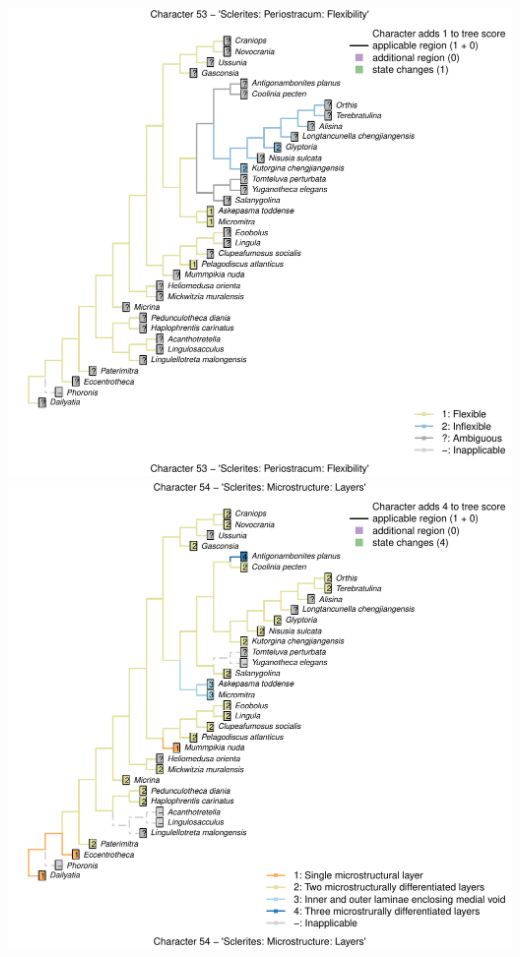 \documentclass[]{book}
\theoremstyle{definition}
\theoremstyle{definition}
\theoremstyle{definition}
\theoremstyle{remark}
\begin{document}
\includegraphics{Brachiopod_phylogeny_files/figure-latex/unnamed-chunk-4-53.pdf}
\includegraphics{Brachiopod_phylogeny_files/figure-latex/unnamed-chunk-4-54.pdf}
\end{document}
